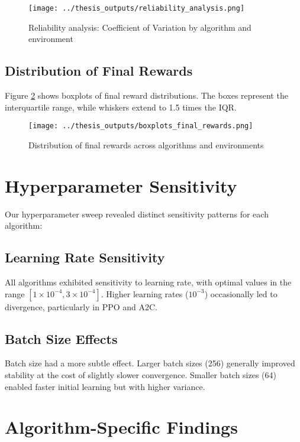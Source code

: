 \documentclass[12pt,a4paper]{report}
\begin{document}
\begin{figure}[h]
\centering
\texttt{[image: ../thesis\_outputs/reliability\_analysis.png]}
\caption{Reliability analysis: Coefficient of Variation by algorithm and environment}
\label{fig:reliability}
\end{figure}

\subsection{Distribution of Final Rewards}

Figure \ref{fig:boxplots} shows boxplots of final reward distributions. The boxes represent the interquartile range, while whiskers extend to 1.5 times the IQR.

\begin{figure}[h]
\centering
\texttt{[image: ../thesis\_outputs/boxplots\_final\_rewards.png]}
\caption{Distribution of final rewards across algorithms and environments}
\label{fig:boxplots}
\end{figure}

\section{Hyperparameter Sensitivity}

Our hyperparameter sweep revealed distinct sensitivity patterns for each algorithm:

\subsection{Learning Rate Sensitivity}

All algorithms exhibited sensitivity to learning rate, with optimal values in the range $[1 \times 10^{-4}, 3 \times 10^{-4}]$. Higher learning rates ($10^{-3}$) occasionally led to divergence, particularly in PPO and A2C.

\subsection{Batch Size Effects}

Batch size had a more subtle effect. Larger batch sizes (256) generally improved stability at the cost of slightly slower convergence. Smaller batch sizes (64) enabled faster initial learning but with higher variance.

\section{Algorithm-Specific Findings}
\end{document}
